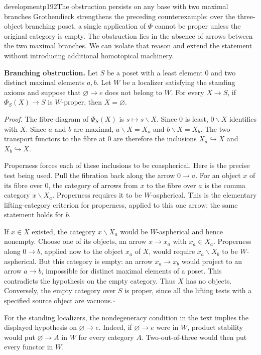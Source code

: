 \begin{dcomment}{development}{p192}{The obstruction persists on any base with two maximal branches}
Grothendieck strengthens the preceding counterexample: over the three-object branching poset, a single application of $\Phi$ cannot be proper unless the original category is empty. The obstruction lies in the absence of arrows between the two maximal branches. We can isolate that reason and extend the statement without introducing additional homotopical machinery.

\textbf{Branching obstruction.}\ours\enspace
Let $S$ be a poset with a least element $0$ and two distinct maximal elements $a,b$. Let $W$ be a localizer satisfying the standing axioms and suppose that $\varnothing\to e$ does not belong to $W$. For every $X\to S$, if $\Phi_S(X)\to S$ is $W$-proper, then $X=\varnothing$.

\emph{Proof.} The fibre diagram of $\Phi_S(X)$ is $s\mapsto s\backslash X$. Since $0$ is least, $0\backslash X$ identifies with $X$. Since $a$ and $b$ are maximal, $a\backslash X=X_a$ and $b\backslash X=X_b$. The two transport functors to the fibre at $0$ are therefore the inclusions $X_a\hookrightarrow X$ and $X_b\hookrightarrow X$.

Properness forces each of these inclusions to be coaspherical. Here is the precise test being used. Pull the fibration back along the arrow $0\to a$. For an object $x$ of its fibre over $0$, the category of arrows from $x$ to the fibre over $a$ is the comma category $x\backslash X_a$. Properness requires it to be $W$-aspherical. This is the elementary lifting-category criterion for properness, applied to this one arrow; the same statement holds for $b$.

If $x\in X$ existed, the category $x\backslash X_a$ would be $W$-aspherical and hence nonempty. Choose one of its objects, an arrow $x\to x_a$ with $x_a\in X_a$. Properness along $0\to b$, applied now to the object $x_a$ of $X$, would require $x_a\backslash X_b$ to be $W$-aspherical. But this category is empty: an arrow $x_a\to x_b$ would project to an arrow $a\to b$, impossible for distinct maximal elements of a poset. This contradicts the hypothesis on the empty category. Thus $X$ has no objects. Conversely, the empty category over $S$ is proper, since all the lifting tests with a specified source object are vacuous.\hfill$\square$

For the standing localizers, the nondegeneracy condition in the text implies the displayed hypothesis on $\varnothing\to e$. Indeed, if $\varnothing\to e$ were in $W$, product stability would put $\varnothing\to A$ in $W$ for every category $A$. Two-out-of-three would then put every functor in $W$.


\end{dcomment}
